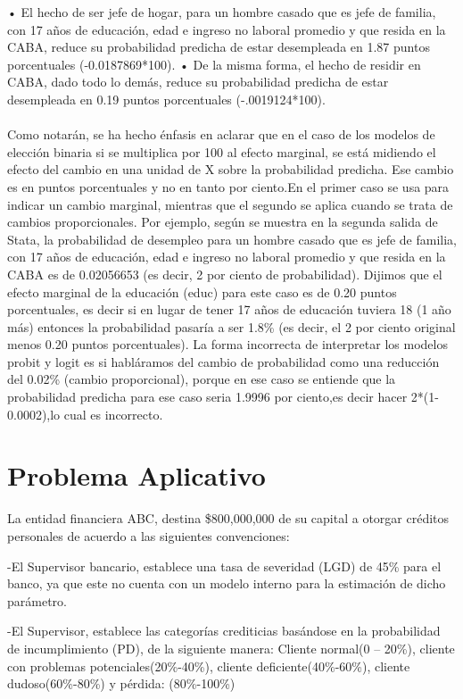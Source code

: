 \documentclass[11pt,fleqn]{book} %
\numberwithin{equation}{section} %
\numberwithin{figure}{section} %
\numberwithin{table}{section} %
\begin{document}
• El hecho de ser jefe de hogar, para un hombre casado que es jefe de familia, con 17 años de educación, edad e ingreso no laboral promedio y que resida en la CABA, reduce su probabilidad predicha de estar desempleada en 1.87 puntos porcentuales (-0.0187869*100).
• De la misma forma, el hecho de residir en CABA, dado todo lo demás, reduce su probabilidad predicha de estar desempleada en 0.19 puntos porcentuales (-.0019124*100).
\\\\
Como notarán, se ha hecho énfasis en aclarar que en el caso de los modelos de elección binaria si se multiplica por 100 al efecto marginal, se está midiendo el efecto del cambio en una unidad de X sobre la probabilidad predicha. Ese cambio es en puntos porcentuales y no en tanto por ciento.En el primer caso se usa para indicar un cambio marginal, mientras que el segundo se aplica cuando se trata
de cambios proporcionales.
Por ejemplo, según se muestra en la segunda salida de Stata, la probabilidad de desempleo para un hombre casado que es jefe de familia, con 17 años de educación, edad e ingreso no laboral promedio y que resida en la CABA es de 0.02056653 (es decir, 2 por ciento de probabilidad). Dijimos que el efecto marginal de la educación (educ) para este caso es de 0.20 puntos porcentuales, es decir si en
lugar de tener 17 años de educación tuviera 18 (1 año más) entonces la probabilidad pasaría a ser 1.8\% (es decir, el 2 por ciento original menos 0.20 puntos porcentuales).
La forma incorrecta de interpretar los modelos probit y logit es si habláramos del cambio de probabilidad como una reducción del 0.02\% (cambio proporcional), porque en ese caso se entiende que
la probabilidad predicha para ese caso seria 1.9996 por ciento,es decir hacer 2*(1-0.0002),lo cual es incorrecto. 




\section{Problema Aplicativo}

La entidad financiera ABC, destina \$800,000,000 de su capital a otorgar créditos personales de acuerdo a las siguientes convenciones:

-El Supervisor bancario, establece una tasa de severidad (LGD) de 45\% para el banco, ya que este no cuenta con un modelo interno para la estimación de dicho parámetro.

-El Supervisor, establece las categorías crediticias basándose en la probabilidad de incumplimiento (PD), de la siguiente manera:
Cliente normal(0 – 20\%), cliente con problemas potenciales(20\%-40\%), cliente deficiente(40\%-60\%), cliente dudoso(60\%-80\%) y pérdida: (80\%-100\%)
\end{document}
